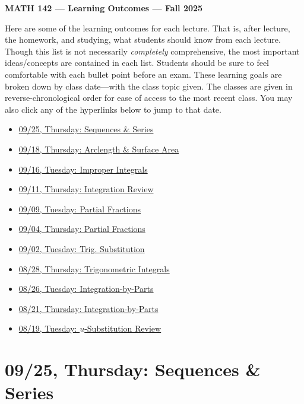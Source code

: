 \documentclass[11pt,letterpaper]{article}
\begin{document}
\begin{center} {\bfseries \LARGE MATH 142 --- Learning Outcomes --- Fall 2025} \end{center}

Here are some of the learning outcomes for each lecture. That is, after lecture, the homework, and studying, what students should know from each lecture. Though this list is not necessarily \textit{completely} comprehensive, the most important ideas/concepts are contained in each list. Students should be sure to feel comfortable with each bullet point before an exam. These learning goals are broken down by class date---with the class topic given. The classes are given in reverse-chronological order for ease of access to the most recent class. You may also click any of the hyperlinks below to jump to that date. 

\begin{itemize}
\item \hyperref[09-25]{09/25, Thursday: Sequences \& Series}
\item \hyperref[09-18]{09/18, Thursday: Arclength \& Surface Area}
\item \hyperref[09-16]{09/16, Tuesday: Improper Integrals}
\item \hyperref[09-11]{09/11, Thursday: Integration Review}
\item \hyperref[09-09]{09/09, Tuesday: Partial Fractions}
\item \hyperref[09-04]{09/04, Thursday: Partial Fractions}
\item \hyperref[09-02]{09/02, Tuesday: Trig. Substitution}
\item \hyperref[08-28]{08/28, Thursday: Trigonometric Integrals}
\item \hyperref[08-26]{08/26, Tuesday: Integration-by-Parts}
\item \hyperref[08-21]{08/21, Thursday: Integration-by-Parts}
\item \hyperref[08-19]{08/19, Tuesday: $u$-Substitution Review}
\end{itemize}


\newpage
\section*{09/25, Thursday: Sequences \& Series\label{09-25}}
\end{document}
